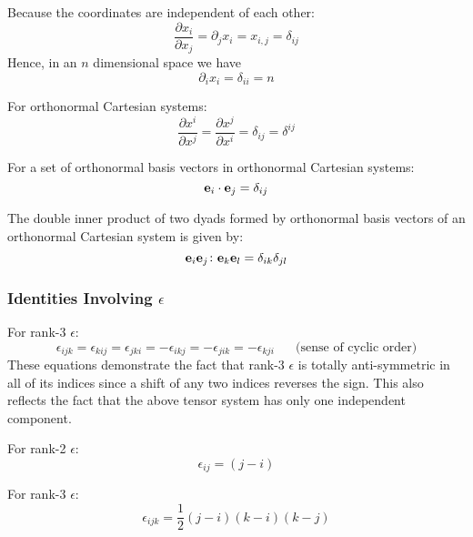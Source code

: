  Because the coordinates are independent of each other:
\begin{equation}
\dfrac{\partial x_{i}}{\partial x_{j}}=\partial_{j}x_{i}=x_{i,j}=\delta_{ij}\label{eqdxdelta}
\end{equation}
Hence, in an $n$ dimensional space we have
\begin{equation}
\partial_{i}x_{i}=\delta_{ii}=n\label{eqdxn}
\end{equation}


 For orthonormal Cartesian systems:
\begin{equation}
\dfrac{\partial x^{i}}{\partial x^{j}}=\dfrac{\partial x^{j}}{\partial x^{i}}=\delta_{ij}=\delta^{ij}\label{eqdxdxdelta}
\end{equation}


 For a set of orthonormal basis vectors in orthonormal Cartesian
systems:
\begin{equation}
\mathbf{ e}_{i}\cdot\mathbf{ e}_{j}=\delta_{ij}
\end{equation}


 The double inner product of two dyads formed by orthonormal
basis vectors of an orthonormal Cartesian system is given by:
\begin{equation}
\mathbf{ e}_{i}\mathbf{ e}_{j}\colon\mathbf{ e}_{k}\mathbf{ e}_{l}=\delta_{ik}\delta_{jl}
\end{equation}



\subsubsection{Identities Involving $\epsilon$}

 For rank-3 $\epsilon$:
\begin{equation}
\epsilon_{ijk}=\epsilon_{kij}=\epsilon_{jki}=-\epsilon_{ikj}=-\epsilon_{jik}=-\epsilon_{kji}\,\,\,\,\,\,\,\,\,\,\text{(sense of cyclic order)}\label{EqEpsilonCycle}
\end{equation}
These equations demonstrate the fact that rank-3 $\epsilon$ is totally
anti-symmetric in all of its indices since a shift of any two indices
reverses the sign. This also reflects the fact that the above tensor
system has only one independent component.

 For rank-2 $\epsilon$:
\begin{equation}
\epsilon_{ij}=\left(j-i\right)
\end{equation}


 For rank-3 $\epsilon$:
\begin{equation}
\epsilon_{ijk}=\dfrac{1}{2}\left(j-i\right)\left(k-i\right)\left(k-j\right)
\end{equation}


